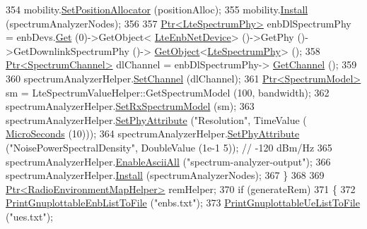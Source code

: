 \begin{DoxyCode}
354       mobility.\hyperlink{classns3_1_1MobilityHelper_ac59d5295076be3cc11021566713a28c5}{SetPositionAllocator} (positionAlloc);
355       mobility.\hyperlink{classns3_1_1MobilityHelper_a07737960ee95c0777109cf2994dd97ae}{Install} (spectrumAnalyzerNodes);
356 
357       \hyperlink{classns3_1_1Ptr}{Ptr<LteSpectrumPhy>} enbDlSpectrumPhy = enbDevs.\hyperlink{classns3_1_1NetDeviceContainer_a677d62594b5c9d2dea155cc5045f4d0b}{Get} (0)->GetObject<
      \hyperlink{classns3_1_1LteEnbNetDevice}{LteEnbNetDevice}> ()->GetPhy ()->GetDownlinkSpectrumPhy ()->
      \hyperlink{classns3_1_1Object_a13e18c00017096c8381eb651d5bd0783}{GetObject}<\hyperlink{classns3_1_1LteSpectrumPhy}{LteSpectrumPhy}> ();
358       \hyperlink{classns3_1_1Ptr}{Ptr<SpectrumChannel>} dlChannel = enbDlSpectrumPhy->
      \hyperlink{classns3_1_1LteSpectrumPhy_a50f13e43568687ee32c5d63e5bf639c2}{GetChannel} ();
359 
360       spectrumAnalyzerHelper.\hyperlink{classns3_1_1SpectrumAnalyzerHelper_a7fb7b79c0706c9aecd427af6c4148031}{SetChannel} (dlChannel);
361       \hyperlink{classns3_1_1Ptr}{Ptr<SpectrumModel>} sm = LteSpectrumValueHelper::GetSpectrumModel (100, bandwidth);
362       spectrumAnalyzerHelper.\hyperlink{classns3_1_1SpectrumAnalyzerHelper_afcfa897fb4c298b02e39ec87717b0b54}{SetRxSpectrumModel} (sm);
363       spectrumAnalyzerHelper.\hyperlink{classns3_1_1SpectrumAnalyzerHelper_a535a79dd9e2fb4293eb9e9e5fcb111ae}{SetPhyAttribute} (\textcolor{stringliteral}{"Resolution"}, TimeValue (
      \hyperlink{group__timecivil_ga17465a639c8d1464e76538afdd78a9f0}{MicroSeconds} (10)));
364       spectrumAnalyzerHelper.\hyperlink{classns3_1_1SpectrumAnalyzerHelper_a535a79dd9e2fb4293eb9e9e5fcb111ae}{SetPhyAttribute} (\textcolor{stringliteral}{"NoisePowerSpectralDensity"}, DoubleValue (1e-1
      5));     \textcolor{comment}{// -120 dBm/Hz}
365       spectrumAnalyzerHelper.\hyperlink{classns3_1_1SpectrumAnalyzerHelper_ad1bb3c14843583ce1227e00758d8ba51}{EnableAsciiAll} (\textcolor{stringliteral}{"spectrum-analyzer-output"});
366       spectrumAnalyzerHelper.\hyperlink{classns3_1_1SpectrumAnalyzerHelper_a64479eb63eb6b5ad5536ee8ecf2c717a}{Install} (spectrumAnalyzerNodes);
367     \}
368 
369   \hyperlink{classns3_1_1Ptr}{Ptr<RadioEnvironmentMapHelper>} remHelper;
370   \textcolor{keywordflow}{if} (generateRem)
371     \{
372       \hyperlink{lena-frequency-reuse_8cc_a7e3aa5272ba032faa7717e0f3ba2f73d}{PrintGnuplottableEnbListToFile} (\textcolor{stringliteral}{"enbs.txt"});
373       \hyperlink{lena-frequency-reuse_8cc_ad818a3dd4c090b8ecaba926e5272c409}{PrintGnuplottableUeListToFile} (\textcolor{stringliteral}{"ues.txt"});

\end{DoxyCode}
